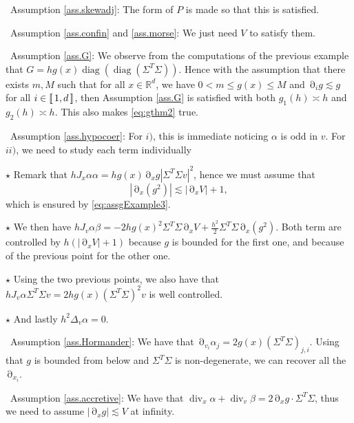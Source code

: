 \documentclass[12pt]{amsart}
\newcommand{\diag}{\operatorname{diag}}
\newcommand{\R}{\mathbb R}
\renewcommand{\div}{\operatorname{div}}
\numberwithin{equation}{section}
\numberwithin{figure}{section}
\DeclareMathOperator{\p}{\partial}
\newcommand{\lb}{\operatorname{[\negthinspace [}}
\newcommand{\rb}{\operatorname{]\negthinspace ]}}
\begin{document}
\textbullet\ Assumption \ref{ass.skewadj}: The form of $P$ is made so that this is satisfied.

\textbullet\ Assumption \ref{ass.confin} and \ref{ass.morse}: We just need $V$ to satisfy them.

\textbullet\ Assumption \ref{ass.G}: We observe from the computations of the previous example that $G = hg(x)\diag(\diag(\Sigma^T\Sigma))$. Hence with the assumption that there exists $m,M$ such that for all $x\in\R^d$, we have $0<m\leq g(x)\leq M$ and $\p_ig \lesssim g$ for all $i\in\lb1,d\rb$, then Assumption \ref{ass.G} is satisfied with both $g_1(h)\asymp h$ and $g_2(h)\asymp h$. This also makes \eqref{eq:gthm2} true.

\textbullet\ Assumption \ref{ass.hypocoer}: For $i)$, this is immediate noticing $\alpha$ is odd in $v$. For $ii)$, we need to study each term individually

\quad $\star$ Remark that $hJ_x\alpha\alpha = hg(x)\p_xg|\Sigma^T\Sigma v|^2$, hence we must assume that
\begin{equation*}
|\p_x(g^2)| \lesssim |\p_x V| + 1,
\end{equation*}
which is ensured by \eqref{eq:assgExample3}.

\quad $\star$ We then have $hJ_v\alpha\beta = -2hg(x)^2\Sigma^T\Sigma\p_xV + \frac{h^2}2\Sigma^T\Sigma\p_x(g^2)$. Both term are controlled by $h(|\p_xV| + 1)$ because $g$ is bounded for the first one, and because of the previous point for the other one.

\quad $\star$ Using the two previous points, we also have that $hJ_v\alpha\Sigma^T\Sigma v = 2hg(x)(\Sigma^T\Sigma)^2v$ is well controlled.

\quad $\star$ And lastly $h^2\Delta_v\alpha = 0$.

\textbullet\ Assumption \ref{ass.Hormander}: We have that $\p_{v_i}\alpha_j = 2g(x)(\Sigma^T\Sigma)_{j,i}$. Using that $g$ is bounded from below and $\Sigma^T\Sigma$ is non-degenerate, we can recover all the $\p_{x_i}$.

\textbullet\ Assumption \ref{ass.accretive}: We have that $\div_x\alpha + \div_v\beta = 2\p_xg\cdot\Sigma^T\Sigma$, thus we need to assume $|\p_xg|\lesssim V$ at infinity.
\end{document}
